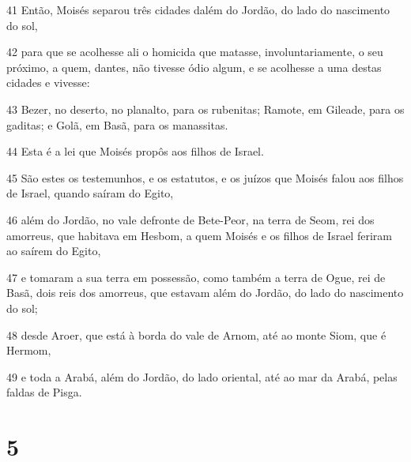 \par 41 Então, Moisés separou três cidades dalém do Jordão, do lado do nascimento do sol,
\par 42 para que se acolhesse ali o homicida que matasse, involuntariamente, o seu próximo, a quem, dantes, não tivesse ódio algum, e se acolhesse a uma destas cidades e vivesse:
\par 43 Bezer, no deserto, no planalto, para os rubenitas; Ramote, em Gileade, para os gaditas; e Golã, em Basã, para os manassitas.
\par 44 Esta é a lei que Moisés propôs aos filhos de Israel.
\par 45 São estes os testemunhos, e os estatutos, e os juízos que Moisés falou aos filhos de Israel, quando saíram do Egito,
\par 46 além do Jordão, no vale defronte de Bete-Peor, na terra de Seom, rei dos amorreus, que habitava em Hesbom, a quem Moisés e os filhos de Israel feriram ao saírem do Egito,
\par 47 e tomaram a sua terra em possessão, como também a terra de Ogue, rei de Basã, dois reis dos amorreus, que estavam além do Jordão, do lado do nascimento do sol;
\par 48 desde Aroer, que está à borda do vale de Arnom, até ao monte Siom, que é Hermom,
\par 49 e toda a Arabá, além do Jordão, do lado oriental, até ao mar da Arabá, pelas faldas de Pisga.

\chapter{5}


